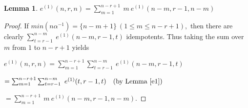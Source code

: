 \documentclass[10pt]{extarticle}
\numberwithin{equation}{section}
\numberwithin{bbb}{section}
\newtheorem{lemma}{Lemma}[section]
\numberwithin{equation}{section}
\begin{document}
\vspace{0.5cm}
\begin{lemma} \label{FIG}
  $e^{(1)}(n,r,n)=\sum_{m=1}^{n-r+1} \ m \ e^{(1)}(n-m,r-1,n-m)$
\end{lemma}

\begin{proof}
  If $min (n\alpha^{-1})=\{n-m+1\}\ (1\leq m \leq n-r+1),$ then there are clearly $\sum_{t=r-1}^{n-m} \ e^{(1)}(n-m,r-1,t)$ idempotents. Thus taking the sum over $m$ from $1$ to $n-r+1$ yields
  
  \vspace{0.5cm}
  \hspace{3cm}
  $e^{(1)}(n,r,n)=\sum_{m=1}^{n-r+1}\sum_{t=r-1}^{n-m} \ e^{(1)}(n-m,r-1,t)$
  
  \vspace{0.5cm}
  \hspace{4.8cm}
  $=\sum_{m=1}^{n-r+1}\sum_{t=r-1}^{n-m} \ e^{(1)}(t,r-1,t)\ \ \ \text{(by Lemma \ref{e1}})$
  
   \vspace{0.5cm}
  \hspace{4.8cm}
  $=\sum_{m=1}^{n-r+1} \ m \ e^{(1)}(n-m,r-1,n-m).$
\end{proof}
\end{document}
